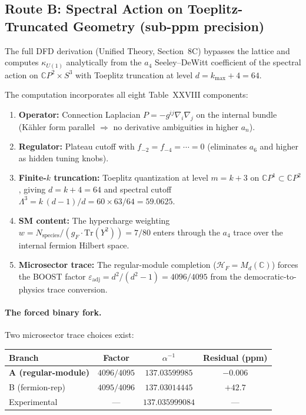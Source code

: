 \documentclass[12pt,a4paper]{article}
\begin{document}
\subsection{Route B: Spectral Action on Toeplitz-Truncated Geometry
(sub-ppm precision)}
\label{sec:spectral}

The full DFD derivation (Unified Theory, Section~8C) bypasses the lattice
and computes $\kappa_{U(1)}$ analytically from the $a_4$ Seeley--DeWitt
coefficient of the spectral action on $\mathbb{C}P^2 \times S^3$ with
Toeplitz truncation at level $d = k_{\max} + 4 = 64$.

The computation incorporates all eight Table~XXVIII components:

\begin{enumerate}
\item \textbf{Operator:} Connection Laplacian $P = -g^{ij}\nabla_i\nabla_j$
  on the internal bundle (K\"ahler form parallel $\Rightarrow$ no derivative
  ambiguities in higher $a_n$).

\item \textbf{Regulator:} Plateau cutoff with $f_{-2} = f_{-4} = \cdots = 0$
  (eliminates $a_6$ and higher as hidden tuning knobs).

\item \textbf{Finite-$k$ truncation:} Toeplitz quantization at level $m = k+3$
  on $\mathbb{C}P^1 \subset \mathbb{C}P^2$, giving $d = k+4 = 64$ and
  spectral cutoff $\Lambda^3 = k\,(d{-}1)/d = 60 \times 63/64 = 59.0625$.

\item \textbf{SM content:} The hypercharge weighting
  $w = N_{\mathrm{species}}/(g_F \cdot \mathrm{Tr}(Y^2)) = 7/80$
  enters through the $a_4$ trace over the internal fermion Hilbert space.

\item \textbf{Microsector trace:} The regular-module completion
  ($\mathcal{H}_F = M_d(\mathbb{C})$) forces the BOOST factor
  $\varepsilon_{\mathrm{adj}} = d^2/(d^2{-}1) = 4096/4095$
  from the democratic-to-physics trace conversion.
\end{enumerate}

\paragraph{The forced binary fork.}
Two microsector trace choices exist:
\begin{center}
\renewcommand{\arraystretch}{1.3}
\begin{tabular}{lccc}
\toprule
Branch & Factor & $\alpha^{-1}$ & Residual (ppm) \\
\midrule
\textbf{A (regular-module)} & $4096/4095$ & $137.03599985$ & $-0.006$ \\
B (fermion-rep) & $4095/4096$ & $137.03014445$ & $+42.7$ \\
\midrule
Experimental & --- & $137.035999084$ & --- \\
\bottomrule
\end{tabular}
\end{center}
\end{document}
